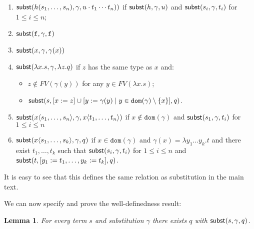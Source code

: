 \documentclass{lmcs}
\theoremstyle{theorem}\newtheorem{theorem}{Theorem}
\theoremstyle{theorem}\newtheorem{lemma}[theorem]{Lemma}
\theoremstyle{theorem}\newtheorem{corollary}[theorem]{Corollary}
\theoremstyle{definition}\newtheorem{definition}[theorem]{Definition}
\theoremstyle{definition}\newtheorem{example}[theorem]{Example}
\newcommand{\FV}{\mathit{FV}}
\newcommand{\domain}{\mathtt{dom}}
\newcommand{\identifier}[1]{\mathtt{#1}}
\newcommand{\afun}{\identifier{f}}
\newcommand{\avar}{x}
\newcommand{\bvar}{y}
\newcommand{\cvar}{z}
\newcommand{\abs}[2]{\lambda #1.#2}
\newcommand{\meta}[2]{#1\langle#2\rangle}
\begin{document}
\begin{enumerate}
\item\label{subst:appl} $\mathsf{subst}(h(s_1,\dots,s_n), \gamma, u \cdot t_1 \cdots t_n))$ if $\mathsf{subst}(h,\gamma,u)$ and $\mathsf{subst}(s_i,\gamma,t_i)$ for $1 \leq i \leq n$;
\item\label{subst:func} $\subrel{\afun,\gamma,\afun}$
\item\label{subst:var} $\subrel{\avar,\gamma,\gamma(\avar)}$
\item\label{subst:abs} $\subrel{\abs{\avar}{s},\gamma,\abs{\cvar}{q}}$ if $\cvar$ has the same type as $\avar$ and:
  \begin{itemize}
  \item $\cvar \notin \FV(\gamma(\bvar))$ for any $\bvar \in \FV(\abs{\avar}{s})$;
  \item $\subrel{s,[\avar:=\cvar] \cup [\bvar := \gamma(\bvar) \mid \bvar \in \domain(\gamma) \setminus \{\avar\}],q}$.
  \end{itemize}
\item\label{subst:boringmeta} $\subrel{\meta{\avar}{s_1,\dots,s_n},\gamma,\meta{\avar}{t_1,\dots,t_n}}$ if
  $x \notin \domain(\gamma)$ and $\mathsf{subst}(s_1,\gamma,t_i)$ for $1 \leq i \leq n$
\item\label{subst:meta} $\subrel{\meta{\avar}{s_1,\dots,s_k},\gamma,q}$ if $\avar \in \domain(\gamma)$ and
  $\gamma(\avar) = \abs{\bvar_1 \dots \bvar_k}{t}$ and there exist $t_1,\dots,t_k$ such that
  $\mathsf{subst}(s_i,\gamma,t_i)$ for $1 \leq i \leq n$ and
  $\subrel{t,[\bvar_1:=t_1,\dots,\bvar_k:=t_k],q}$.
\end{enumerate}
It is easy to see that this defines the same relation as substitution in the main text.

We can now specify and prove the well-definedness result:

\begin{lemma}\label{lem:substdefined}
For every term $s$ and substitution $\gamma$ there exists $q$ with $\mathsf{subst}(s,\gamma,q)$. %
\end{lemma}
\end{document}
